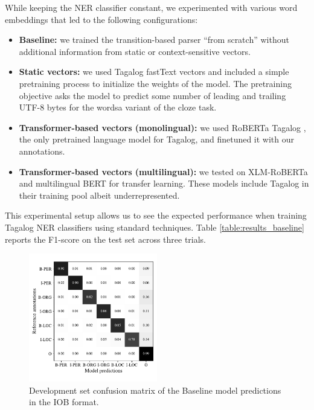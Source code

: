 \documentclass[11pt]{article}
\begin{document}
While keeping the NER classifier constant, we experimented with various word embeddings that led to the following configurations:

\begin{itemize}
  \item \textbf{Baseline:} we trained the transition-based parser ``from scratch'' without additional information from static or context-sensitive vectors.
  \item \textbf{Static vectors:} we used Tagalog fastText vectors \cite{Bojanowski2016EnrichingWV} and included a simple pretraining process to initialize the weights of the model.
  The pretraining objective asks the model to predict some number of leading and trailing UTF-8 bytes for the words\textemdash a variant of the cloze task.
  \item \textbf{Transformer-based vectors (monolingual):} we used RoBERTa Tagalog \cite{Cruz2021ImprovingLL}, the only pretrained language model for Tagalog, and finetuned it with our annotations.
  \item \textbf{Transformer-based vectors (multilingual):} we tested on XLM-RoBERTa \cite{Conneau2019UnsupervisedCR} and multilingual BERT \cite{Devlin2019BERTPO} for transfer learning.
  These models include Tagalog in their training pool albeit underrepresented.
\end{itemize}

This experimental setup allows us to see the expected performance when training Tagalog NER classifiers using standard techniques.
Table \ref{table:results_baseline} reports the F1-score on the test set across three trials.


\begin{figure}[t]
\includegraphics[width=0.5\textwidth]{figures/confusion}
\caption{Development set confusion matrix of the Baseline model predictions in the IOB format.}
\label{fig:confusion}
\centering
\end{figure}
\end{document}
